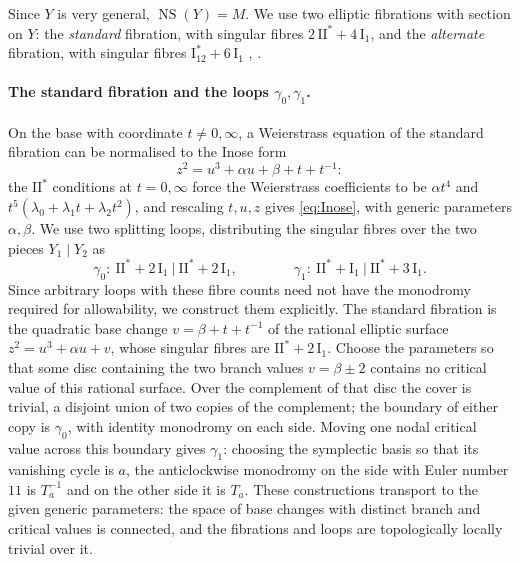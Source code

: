 \documentclass[11pt]{article}
\newcommand{\NS}{\operatorname{NS}}
\newcommand{\II}{\mathrm{II}}
\newcommand{\I}{\mathrm{I}}
\theoremstyle{definition}
\theoremstyle{remark}
\begin{document}
Since \(Y\) is very general, \(\NS(Y)=M\). We use two elliptic
fibrations with section on \(Y\): the \emph{standard} fibration, with
singular fibres \(2\,\II^*+4\,\I_1\), and the \emph{alternate}
fibration, with singular fibres \(\I_{12}^*+6\,\I_1\)
\cite[\S2.2]{DPT}, \cite{CD}.

\paragraph{The standard fibration and the loops \(\gamma_0,\gamma_1\).}
On the base with coordinate \(t\neq0,\infty\), a Weierstrass equation
of the standard fibration can be normalised to the Inose form
\cite{CD}
\begin{equation}\label{eq:Inose}
 z^2=u^3+\alpha u+\beta+t+t^{-1}:
\end{equation}
the \(\II^*\) conditions at \(t=0,\infty\) force the Weierstrass
coefficients to be \(\alpha t^4\) and
\(t^5(\lambda_0+\lambda_1t+\lambda_2t^2)\), and
rescaling \(t,u,z\) gives \eqref{eq:Inose}, with generic parameters
\(\alpha,\beta\). We use two splitting loops, distributing the
singular fibres over the two pieces \(Y_1\mid Y_2\) as
\begin{equation}\label{eq:Eloops}
 \gamma_0\colon\ \II^*+2\,\I_1\ \big|\ \II^*+2\,\I_1,\qquad\qquad
 \gamma_1\colon\ \II^*+\I_1\ \big|\ \II^*+3\,\I_1 .
\end{equation}
Since arbitrary loops with these fibre counts need not have the
monodromy required for allowability, we construct them explicitly.
The standard fibration is the quadratic base change
\(v=\beta+t+t^{-1}\) of the rational elliptic surface
\(z^2=u^3+\alpha u+v\), whose singular fibres are \(\II^*+2\,\I_1\).
Choose the parameters so that some disc containing the two branch
values \(v=\beta\pm2\) contains no critical value of this rational
surface. Over the complement of that disc the cover is trivial, a
disjoint union of two copies of the complement; the boundary of either copy is \(\gamma_0\), with
identity monodromy on each side. Moving one nodal critical value
across this boundary gives \(\gamma_1\): choosing the symplectic basis
so that its vanishing cycle is \(a\), the anticlockwise monodromy on
the side with Euler number \(11\) is \(T_a^{-1}\) and on the other side
it is \(T_a\). These
constructions transport to the given generic parameters: the space of
base changes with distinct branch and critical values is connected,
and the fibrations and loops are topologically locally trivial over it.
\end{document}
